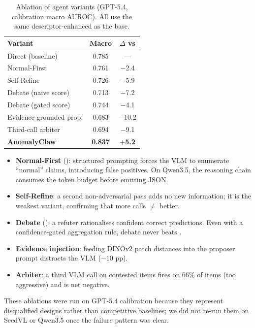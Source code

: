\begin{table}[h]
\centering
\caption{Ablation of agent variants (GPT-5.4, calibration macro AUROC). All use the same descriptor-enhanced   as the base.}
\label{tab:ablation_appendix}
\small
\begin{tabular}{lcc}
\toprule
Variant & Macro & $\Delta$ vs  \\
\midrule
Direct (baseline)     & 0.785 & --- \\
Normal-First          & 0.761 & $-$2.4 \\
Self-Refine           & 0.726 & $-$5.9 \\
Debate (naive score)  & 0.713 & $-$7.2 \\
Debate (gated score)  & 0.744 & $-$4.1 \\
Evidence-grounded prop.  & 0.683 & $-$10.2 \\
Third-call arbiter       & 0.694 & $-$9.1 \\
\midrule
\textbf{AnomalyClaw}     & \textbf{0.837} & \textbf{$+$5.2} \\
\bottomrule
\end{tabular}
\end{table}

\begin{itemize}
    \item \textbf{Normal-First} (): structured prompting forces the VLM to enumerate ``normal'' claims, introducing false positives. On Qwen3.5, the reasoning chain consumes the token budget before emitting JSON.
    \item \textbf{Self-Refine}: a second non-adversarial pass adds no new information; it is the weakest variant, confirming that more calls $\neq$ better.
    \item \textbf{Debate} (): a refuter rationalises confident correct predictions. Even with a confidence-gated aggregation rule, debate never beats .
    \item \textbf{Evidence injection}: feeding DINOv2 patch distances into the proposer prompt distracts the VLM ($-10$ pp).
    \item \textbf{Arbiter}: a third VLM call on contested items fires on 66\% of items (too aggressive) and is net negative.
\end{itemize}

These ablations were run on GPT-5.4 calibration because they represent disqualified designs rather than competitive baselines; we did not re-run them on SeedVL or Qwen3.5 once the failure pattern was clear.


